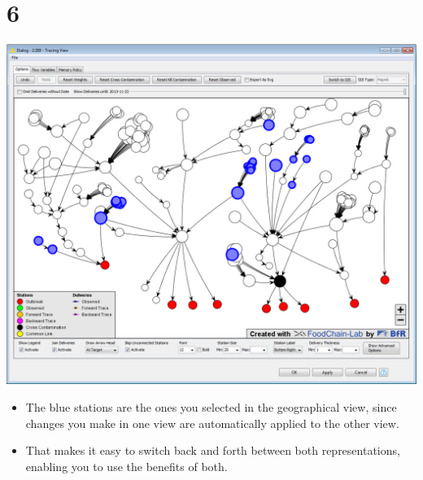 \documentclass[10pt]{beamer}
\begin{document}
\section{6}
\begin{frame}
	\begin{center}
  		\includegraphics[height=0.6\textheight]{6.png}
	\end{center}
	\begin{itemize}
		\item The blue stations are the ones you selected in the geographical view, since changes you make in one view are automatically applied to the other view.
		\item That makes it easy to switch back and forth between both representations, enabling you to use the benefits of both.
	\end{itemize}
\end{frame}
\end{document}
